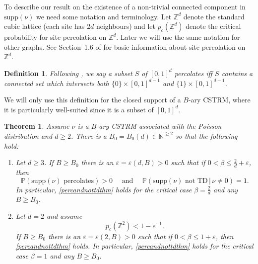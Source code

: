 \documentclass[12pt]{article}
\newtheorem{theorem}{Theorem}
\numberwithin{theorem}{section}
\theoremstyle{def}
\newtheorem*{definition}{Definition}
\numberwithin{equation}{section}
\renewcommand{\P}{\mathbb{P}}
\newcommand{\Z}{\mathbb{Z}}
\newcommand{\N}{\mathbb{N}}
\newcommand{\veps}{\varepsilon}
\newcommand{\supp}{\mathrm{supp}}
\begin{document}
To describe our result on the existence of a non-trivial connected component in $\supp(\nu)$ we need some notation and terminology. 
Let $\Z^d$ denote the standard cubic lattice (each site has $2d$ neighbours) and let $p_c(\Z^d)$ denote the critical probability for site percolation on $\Z^d$.  
Later we will use the same notation for other graphs.  
See Section~1.6 of \cite{G99} for basic information about site percolation on $\Z^d$.

\begin{definition}
Following \cite{FG92}, we say a subset $S$ of $[0,1]^d$ percolates iff $S$ contains a connected set which intersects both $\{0\}\times [0,1]^{d-1}$ and $\{1\}\times [0,1]^{d-1}$. 
\end{definition}
We will only use this definition for the closed support of a $B$-ary CSTRM, where it is particularly well-suited since it is a subset of $[0,1]^d$.

\begin{theorem}\label{thm:perc2} Assume $\nu$ is a $B$-ary CSTRM associated with the Poisson distribution and $d\ge 2$. There is a $B_0=B_0(d)\in\N^{\ge 2}$ so that the following hold:
\begin{enumerate}[label=\emph{(\alph*)}, ref=(\alph*)]
	\item\label{it:perc2:a} Let $d\ge 3$. 
	If $B\ge B_0$ there is an $\veps=\veps(d,B)>0$ such that if $0<\beta\le \frac{2}{d}+\veps$, then 
	\begin{equation}\label{percandnottdthm}
\P(\supp(\nu) \text{ percolates})>0 \quad \text{ and } \quad \P(\supp(\nu)\text{ not TD}\,|\, \nu\neq 0)=1.
\end{equation}
	In particular, \eqref{percandnottdthm} holds for the critical case $\beta=\frac{2}{d}$ and any $B\ge B_0$.
	\item\label{it:perc2:b} Let $d=2$ and assume
	\begin{equation}\label{pccond}
		p_c(\Z^2)<1-e^{-1}.
	\end{equation}
If $B\ge B_0$ there is an $\veps=\veps(2,B)>0$ such that if $0<\beta\le 1+\veps$, then \eqref{percandnottdthm} holds.
In particular, \eqref{percandnottdthm} holds for the critical case $\beta=1$ and any $B\ge B_0$.
\end{enumerate} 
\end{theorem}
\end{document}
